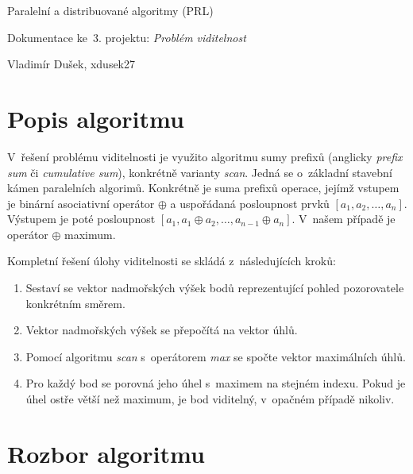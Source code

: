 \documentclass[11pt, a4paper, titlepage]{article}
\begin{document}

\begin{center}
    \Large Paralelní a distribuované algoritmy (PRL)
    \bigskip

    \Large Dokumentace ke~$3.$ projektu: \textit{Problém viditelnost}
    \bigskip

    \Large Vladimír Dušek, xdusek27
    \bigskip
\end{center}


\section{Popis algoritmu}\label{sec:popis}

V~řešení problému viditelnosti je využito algoritmu sumy prefixů
(anglicky \textit{prefix sum} či \textit{cumulative sum}),
konkrétně varianty \textit{scan}.
Jedná se o~základní stavební kámen paralelních algorimů.
Konkrétně je suma prefixů operace, jejímž vstupem je binární
asociativní operátor $\oplus$ a uspořádaná posloupnost prvků
$[a_1, a_2, \dots, a_n]$. Výstupem je poté posloupnost
$[a_1, a_1 \oplus a_2, \dots, a_{n-1} \oplus a_n]$.
V~našem případě je operátor $\oplus$ maximum.

Kompletní řešení úlohy viditelnosti se skládá z~následujících kroků:

\begin{enumerate}
    \item Sestaví se vektor nadmořských výšek bodů reprezentující
    pohled pozorovatele konkrétním směrem.
    \item Vektor nadmořských výšek se přepočítá na vektor úhlů.
    \item Pomocí algoritmu \textit{scan} s~operátorem \textit{max}
          se spočte vektor maximálních úhlů.
    \item Pro každý bod se porovná jeho úhel s~maximem na stejném
          indexu. Pokud je úhel ostře větší než maximum, je bod
          viditelný, v~opačném případě nikoliv.
\end{enumerate}


\section{Rozbor algoritmu}\label{sec:rozbor}
\end{document}
